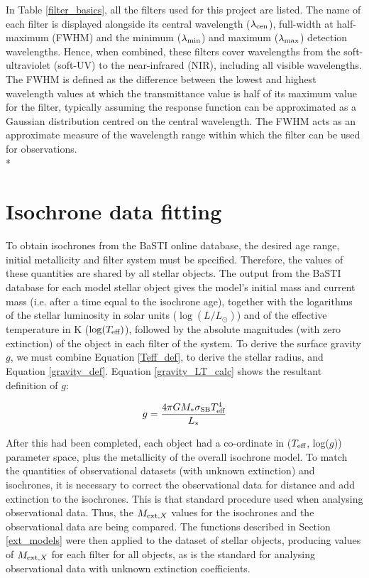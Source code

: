 \documentclass[12pt, a4paper]{report}
\begin{document}
In Table \ref{filter_basics}, all the filters used for this project are listed. The name of each filter is displayed alongside its central wavelength ($\lambda_{\textnormal{cen}}$), full-width at half-maximum (FWHM) and the minimum ($\lambda_{\textnormal{min}}$) and maximum ($\lambda_{\textnormal{max}}$) detection wavelengths. Hence, when combined, these filters cover wavelengths from the soft-ultraviolet (soft-UV) to the near-infrared (NIR), including all visible wavelengths. The FWHM is defined as the difference between the lowest and highest wavelength values at which the transmittance value is half of its maximum value for the filter, typically assuming the response function can be approximated as a Gaussian distribution centred on the central wavelength. The FWHM acts as an approximate measure of the wavelength range within which the filter can be used for observations.\\*

\section{Isochrone data fitting} \label{isoc_fit}
To obtain isochrones from the BaSTI online database, the desired age range, initial metallicity and filter system must be specified. Therefore, the values of these quantities are shared by all stellar objects. The output from the BaSTI database for each model stellar object gives the model's initial mass and current mass (i.e. after a time equal to the isochrone age), together with the logarithms of the stellar luminosity in solar units ($\log(L/L_{\odot})$) and of the effective temperature in K ($\log(T_{\textnormal{eff}})$), followed by the absolute magnitudes (with zero extinction) of the object in each filter of the system. To derive the surface gravity $g$, we must combine Equation \ref{Teff_def}, to derive the stellar radius, and Equation \ref{gravity_def}. Equation \ref{gravity_LT_calc} shows the resultant definition of $g$:

\begin{equation}
\label{gravity_LT_calc}
g = \frac{4 \pi G M_{*} \sigma_{\textnormal{SB}} T_{\textnormal{eff}}^{4}}{L_{*}}
\end{equation}

After this had been completed, each object had a co-ordinate in ($T_{\textnormal{eff}}$, log($g$)) parameter space, plus the metallicity of the overall isochrone model. To match the quantities of observational datasets (with unknown extinction) and isochrones, it is necessary to correct the observational data for distance and add extinction to the isochrones. This is that standard procedure used when analysing observational data. Thus, the $M_{\textnormal{ext},X}$ values for the isochrones and the observational data are being compared. The functions described in Section \ref{ext_models} were then applied to the dataset of stellar objects, producing values of $M_{\textnormal{ext},X}$ for each filter for all objects, as is the standard for analysing observational data with unknown extinction coefficients.
\end{document}
